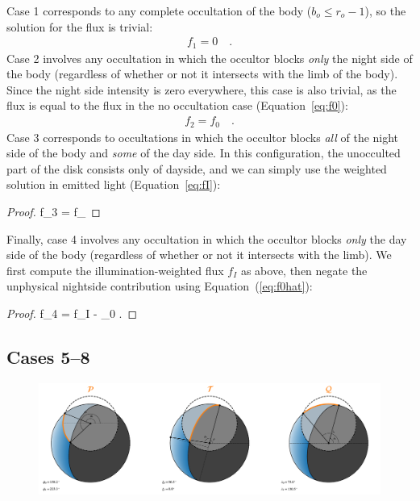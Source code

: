 \documentclass[modern]{aastex62}
\begin{document}
Case 1 corresponds to any complete occultation of the body
($b_o \le r_o - 1$), so the solution for the flux is trivial:
%
\begin{align}
    \label{eq:f1}
    f_1 = 0
    \quad.
\end{align}
%
Case 2 involves any occultation in which the occultor blocks \emph{only} the
night side of the body (regardless of whether or not it intersects with the
limb of the body). Since the night side intensity is zero everywhere, this case
is also trivial, as the flux is equal to the flux in the no occultation case
(Equation~\ref{eq:f0}):
%
\begin{align}
    \label{eq:f2}
    f_2 = f_0
    \quad.
\end{align}
%
Case 3 corresponds to occultations in which the occultor blocks \emph{all} of
the night side of the body and \emph{some} of the day side. In this
configuration, the unocculted part of the disk consists only of dayside, and
we can simply use the weighted solution in emitted light
(Equation~\ref{eq:fI}):
%
\begin{proof}{}
    \label{eq:f3}
    f_3 = f_
\end{proof}
%
Finally, case 4 involves any occultation in which the occultor blocks
\emph{only} the day side of the body (regardless of whether or not it
intersects with the limb). We first compute the illumination-weighted flux
$f_I$ as above, then negate the unphysical nightside contribution
using Equation~(\ref{eq:f0hat}):
%
\begin{proof}{}
    \label{eq:f4}
    f_4 = f_I - _0
    \quad.
\end{proof}

%

\subsection{Cases 5--8}
\label{sec:cases-5-8}
%

\begin{figure}[t!]
    \begin{centering}
        \includegraphics[width=\linewidth]{figures/geometry.pdf}
    \end{centering}
\end{figure}
\end{document}
